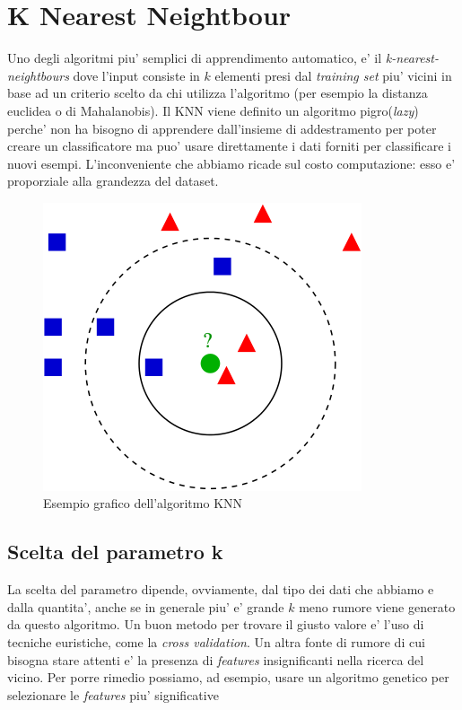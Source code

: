 \section{K Nearest Neightbour}
Uno degli algoritmi piu' semplici di apprendimento automatico, e' il \textit{k-nearest-neightbours} dove l'input consiste in $k$ elementi presi dal \textit{training set} piu' vicini in base ad un criterio scelto da chi utilizza l'algoritmo (per esempio la distanza euclidea o di Mahalanobis). Il KNN viene definito un algoritmo pigro(\textit{lazy}) perche' non ha bisogno di apprendere dall'insieme di addestramento per poter creare un classificatore ma puo' usare direttamente i dati forniti per classificare i nuovi esempi. L'inconveniente che abbiamo ricade sul costo computazione: esso e' proporziale alla grandezza del dataset.


\begin{figure}[H]
	\centering
	\includegraphics[width=0.7\linewidth]{img/knn_example}
	\caption{Esempio grafico dell'algoritmo KNN}
	\label{fig:knnexample}
\end{figure}


\subsection{Scelta del parametro k}
La scelta del parametro dipende, ovviamente, dal tipo dei dati che abbiamo e dalla quantita', anche se in generale piu' e' grande $k$ meno rumore viene generato da questo algoritmo. Un buon metodo per trovare il giusto valore e' l'uso di tecniche euristiche, come la \textit{cross validation}. Un altra fonte di rumore di cui bisogna stare attenti e' la presenza di \textit{features} insignificanti nella ricerca del vicino. Per porre rimedio possiamo, ad esempio, usare un algoritmo genetico per selezionare le \textit{features} piu' significative

